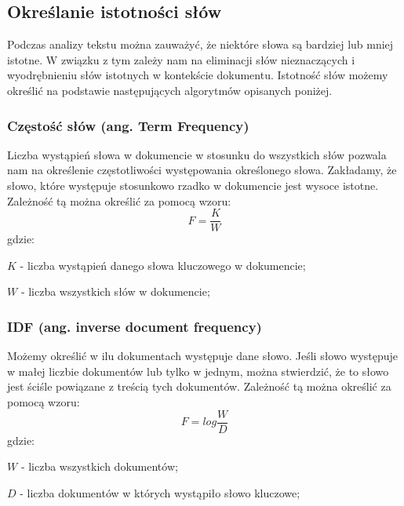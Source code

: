 \documentclass{classrep}
\begin{document}
\subsection{Określanie istotności słów}
Podczas analizy tekstu można zauważyć, że niektóre słowa są bardziej lub mniej istotne. W związku z tym zależy nam
na eliminacji słów nieznaczących i wyodrębnieniu słów istotnych w kontekście dokumentu. Istotność słów możemy określić
na podstawie następujących algorytmów opisanych poniżej.


\subsubsection{Częstość słów (ang. Term Frequency)}
Liczba wystąpień słowa w dokumencie w stosunku do wszystkich słów pozwala nam na określenie częstotliwości występowania
określonego słowa. Zakładamy, że słowo, które występuje stosunkowo rzadko w dokumencie jest wysoce istotne. Zależność tą
można określić za pomocą wzoru:
\begin{equation}
    F=\frac{K}{W}
\end{equation}
gdzie:\\
\begin{description}
    \item $K$ - liczba wystąpień danego słowa kluczowego w dokumencie;
    \item $W$ - liczba wszystkich słów w dokumencie;
\end{description}

\subsubsection{IDF (ang. inverse document frequency)}
Możemy określić w ilu dokumentach występuje dane słowo. Jeśli słowo występuje w małej liczbie dokumentów lub tylko w
jednym, można stwierdzić, że to słowo jest ściśle powiązane z treścią tych dokumentów. Zależność tą można określić za
pomocą wzoru:
\begin{equation}
    F=log \frac{W}{D}
\end{equation}
gdzie:\\
\begin{description}
    \item $W$ - liczba wszystkich dokumentów;
    \item $D$ - liczba dokumentów w których wystąpiło słowo kluczowe;
\end{description}
\end{document}
